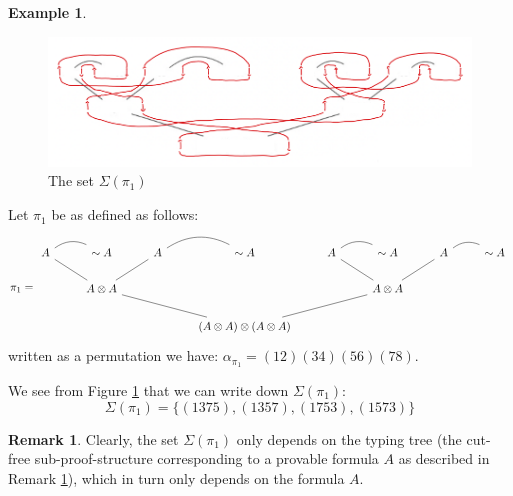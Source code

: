 \documentclass[12pt]{article}
\theoremstyle{plain}
\theoremstyle{definition}
\newtheorem{remark}[thm]{Remark}
\newtheorem{example}[thm]{Example}
\newcommand{\negation}{\sim}
\begin{document}
\begin{example}\label{ex:counter}
\begin{figure}[h]
    \centering
    \includegraphics[width = 17cm]{Permutations.png}
    \caption{The set $\Sigma(\pi_1)$}
    \label{fig:counter_one}
\end{figure}
Let $\pi_1$ be as defined as follows:
\begin{equation}
\pi_1 = \begin{tikzcd}
A \arrow[r, dash,bend left] \arrow[rd,dash] & \negation A             & A \arrow[r, dash,bend left] \arrow[ld,dash] & \negation A                         & A \arrow[r, dash,bend left] \arrow[rd,dash] & \negation A             & A \arrow[r, dash,bend left] \arrow[ld,dash] & \negation A \\
                                  & A \otimes A \arrow[rrd,dash] &                                   &                                     &                                   & A \otimes A \arrow[lld,dash] &                                   &             \\
                                  &                         &                                   & (A \otimes A) \otimes (A \otimes A) &                                   &                         &                                   &            
\end{tikzcd}
\end{equation}
written as a permutation we have: $\alpha_{\pi_1} = (12)(34)(56)(78)$.

We see from Figure \ref{ex:counter} that we can write down $\Sigma(\pi_1)$:
\begin{equation}
\Sigma(\pi_1) = \lbrace (1375), (1357), (1753), (1573)\rbrace
\end{equation}
\begin{remark}\label{rmk:trunk}
Clearly, the set $\Sigma(\pi_1)$ only depends on the typing tree (the cut-free sub-proof-structure corresponding to a provable formula $A$ as described in Remark \ref{rmk:trunk}), which in turn only depends on the formula $A$.
\end{remark}
\end{example}
\end{document}
